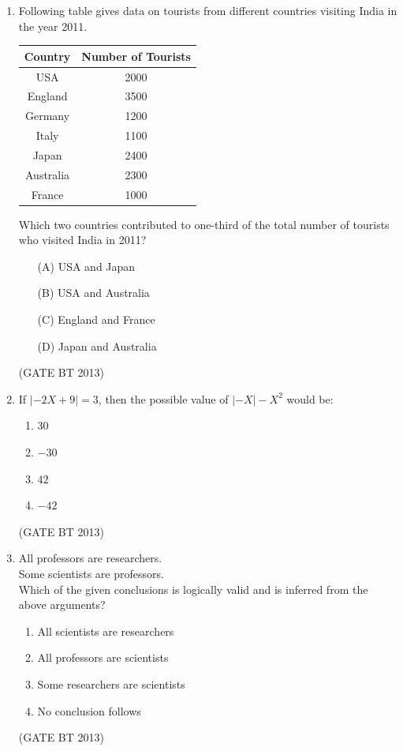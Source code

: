 \documentclass[journal,12pt,onecolumn]{IEEEtran}
\theoremstyle{remark}
\begin{document}
\begin{enumerate}
\item 
Following table gives data on tourists from different countries visiting India in the year 2011.

\begin{center}
\begin{tabular}{|c|c|}
\hline
\textbf{Country} & \textbf{Number of Tourists} \\
\hline
USA & 2000 \\
England & 3500 \\
Germany & 1200 \\
Italy & 1100 \\
Japan & 2400 \\
Australia & 2300 \\
France & 1000 \\
\hline
\end{tabular}
\end{center}

Which two countries contributed to one-third of the total number of tourists who visited India in 2011?

\begin{enumerate}
    \item[(A)] USA and Japan
    \item[(B)] USA and Australia
    \item[(C)] England and France
    \item[(D)] Japan and Australia
\end{enumerate} \hfill(GATE BT 2013)

\item 

If \(\left| -2X + 9 \right| = 3\), then the possible value of \(\left| -X \right| - X^2\) would be:

\begin{enumerate}
    \item $30$
    \item $-30$
    \item $42$
    \item $-42$
\end{enumerate} \hfill(GATE BT 2013)

\item 
All professors are researchers. \\
Some scientists are professors. \\

Which of the given conclusions is logically valid and is inferred from the above arguments?

\begin{enumerate}
    \item All scientists are researchers
    \item All professors are scientists
    \item Some researchers are scientists
    \item No conclusion follows
\end{enumerate} \hfill(GATE BT 2013)
\end{enumerate}
\end{document}
